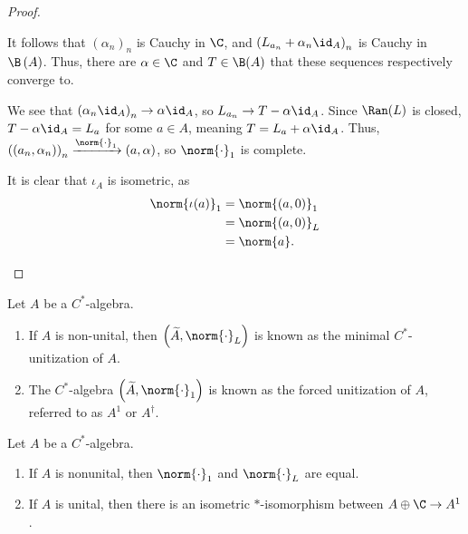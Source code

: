 \documentclass[10pt]{mypackage}
\begin{document}
\begin{proof}
\begin{enumerate}[(1)]
      It follows that $\left(\alpha_n\right)_n$ is Cauchy in $\C$, and $\left(L_{a_n} + \alpha_n \id_{A}\right)_n$ is Cauchy in $\B\left(A\right)$. Thus, there are $\alpha\in \C$ and $T\in \B(A)$ that these sequences respectively converge to.\newline

      We see that $\left(\alpha_n\id_{A}\right)_n \rightarrow \alpha\id_A$, so $L_{a_n}\rightarrow T - \alpha \id_A$. Since $\Ran(L)$ is closed, $T - \alpha \id_A = L_a$ for some $a\in A$, meaning $T = L_a + \alpha \id_A$. Thus, $\left(\left(a_n,\alpha_n\right)\right)_n\xrightarrow{\norm{\cdot}_1} \left(a,\alpha\right)$, so $\norm{\cdot}_1$ is complete.\newline

      It is clear that $\iota_A$ is isometric, as
      \begin{align*}
        \norm{\iota(a)}_1 &= \norm{\left(a,0\right)}_1\\
                          &= \norm{\left(a,0\right)}_L\\
                          &= \norm{a}.
      \end{align*}
  \end{enumerate}
\end{proof}
\begin{definition}
  Let $A$ be a $C^{\ast}$-algebra.
  \begin{enumerate}[(1)]
    \item If $A$ is non-unital, then $\left(\widetilde{A},\norm{\cdot}_L\right)$ is known as the minimal $C^{\ast}$-unitization of $A$.
    \item The $C^{\ast}$-algebra $\left(\widetilde{A},\norm{\cdot}_1\right)$ is known as the forced unitization of $A$, referred to as $A^1$ or $A^\dagger$.
  \end{enumerate}
\end{definition}
\begin{proposition}
  Let $A$ be a $C^{\ast}$-algebra.
  \begin{enumerate}[(1)]
    \item If $A$ is nonunital, then $\norm{\cdot}_1$ and $\norm{\cdot}_L$ are equal.
    \item If $A$ is unital, then there is an isometric $\ast$-isomorphism between $A\oplus \C \rightarrow A^1$.
  \end{enumerate}
\end{proposition}
\end{document}
